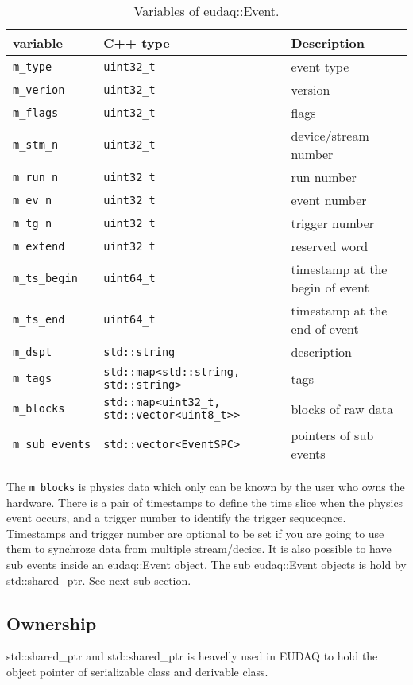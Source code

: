 \begin{table}
\centering
\small
\begin{tabular}{ l | l | l }
  \textbf{variable} & \textbf{C++ type} & \textbf{Description}\\
  \hline
  \texttt{m\_type} & \texttt{uint32\_t} & event type\\
  \texttt{m\_verion} & \texttt{uint32\_t} & version\\
  \texttt{m\_flags} & \texttt{uint32\_t} & flags\\
  \texttt{m\_stm\_n} & \texttt{uint32\_t} & device/stream number\\
  \texttt{m\_run\_n} & \texttt{uint32\_t} & run number\\
  \texttt{m\_ev\_n} & \texttt{uint32\_t} & event number\\
  \texttt{m\_tg\_n} & \texttt{uint32\_t} & trigger number\\
  \texttt{m\_extend} & \texttt{uint32\_t} & reserved word\\
  \texttt{m\_ts\_begin} & \texttt{uint64\_t} & timestamp at the begin of event\\
  \texttt{m\_ts\_end} & \texttt{uint64\_t} & timestamp at the end of event\\
  \texttt{m\_dspt} & \texttt{std::string} & description\\
  \texttt{m\_tags} & \texttt{std::map<std::string, std::string>} & tags\\
  \texttt{m\_blocks} & \texttt{std::map<uint32\_t, std::vector<uint8\_t>>} & blocks of raw data\\
  \texttt{m\_sub\_events} & \texttt{std::vector<EventSPC>} & pointers of sub events\\
\end{tabular}
\caption{Variables of eudaq::Event.}
\label{tab:eventdata}
\end{table}

The \texttt{m\_blocks} is physics data which only can be known by the user who owns the hardware. There is a pair of timestamps to define the time slice when the physics event occurs, and a trigger number to identify the trigger sequceqnce. Timestamps and trigger number are optional to be set if you are going to use them to synchroze data from multiple stream/decice. It is also possible to have sub events inside an eudaq::Event object. The sub eudaq::Event objects is hold by std::shared\_ptr. See next sub section.

\subsection{Ownership}
std::shared\_ptr and std::shared\_ptr is heavelly used in EUDAQ to hold the object pointer of serializable class and derivable class. 

